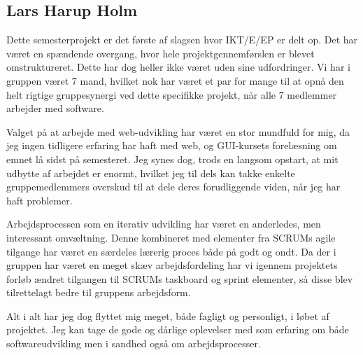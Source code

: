 \subsection*{Lars Harup Holm}
Dette semesterprojekt er det første af slagsen hvor IKT/E/EP er delt op. Det har været en spændende overgang, hvor hele projektgennemførslen er blevet omstruktureret. Dette har dog heller ikke været uden sine udfordringer. Vi har i gruppen været 7 mand, hvilket nok har været et par for mange til at opnå den helt rigtige gruppesynergi ved dette specifikke projekt, når alle 7 medlemmer arbejder med software.

Valget på at arbejde med web-udvikling har været en stor mundfuld for mig, da jeg ingen tidligere erfaring har haft med web, og  GUI-kursets forelæsning om emnet lå sidst på semesteret. Jeg synes dog, trods en langsom opstart, at mit udbytte af arbejdet er enormt, hvilket jeg til dels kan takke enkelte gruppemedlemmers overskud til at dele deres forudliggende viden, når jeg har haft problemer.

Arbejdsprocessen som en iterativ udvikling har været en anderledes, men interessant omvæltning. Denne kombineret med elementer fra SCRUMs agile tilgange har været en særdeles lærerig proces både på godt og ondt. Da der i gruppen har været en meget skæv arbejdsfordeling har vi igennem projektets forløb ændret tilgangen til SCRUMs taskboard og sprint elementer, så disse blev tilrettelagt bedre til gruppens arbejdsform. 

Alt i alt har jeg dog flyttet mig meget, både fagligt og personligt, i løbet af projektet. Jeg kan tage de gode og dårlige oplevelser med som erfaring om både softwareudvikling men i sandhed også om arbejdsprocesser.